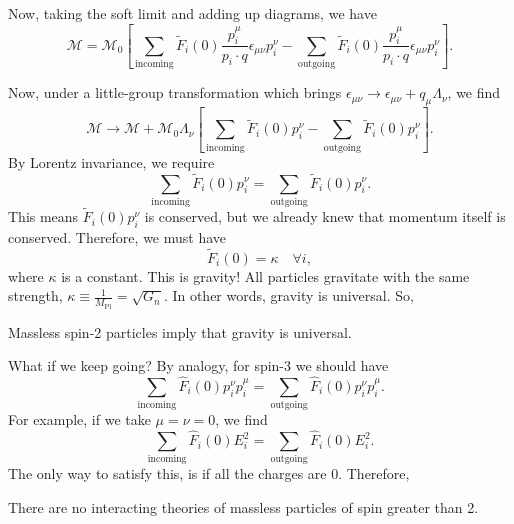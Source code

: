 \documentclass[11pt]{article}
\theoremstyle{definition}
\begin{document}
Now, taking the soft limit and adding up diagrams, we have
\begin{equation}
    \mathcal{M} = \mathcal{M}_0\left[ \sum_\text{incoming}\tilde{F}_i(0) \frac{p_i^\mu}{p_i\cdot q} \epsilon_{\mu\nu}p_i^\nu -  \sum_\text{outgoing}\tilde{F}_i(0) \frac{p_i^\mu}{p_i\cdot q} \epsilon_{\mu\nu}p_i^\nu \right].
\end{equation}

Now, under a little-group transformation which brings $\epsilon_{\mu\nu} \rightarrow \epsilon_{\mu\nu} + q_\mu \Lambda_\nu$, we find
\begin{equation}
    \mathcal{M} \rightarrow \mathcal{M} + \mathcal{M}_0\Lambda_\nu \left[ \sum_\text{incoming}\tilde{F}_i(0) p_i^\nu -  \sum_\text{outgoing}\tilde{F}_i(0) p_i^\nu \right].
\end{equation}
By Lorentz invariance, we require
\begin{equation}
    \sum_\text{incoming}\tilde{F}_i(0) p_i^\nu = \sum_\text{outgoing}\tilde{F}_i(0) p_i^\nu. 
\end{equation}
This means $\tilde{F}_i(0) p_i^\nu$ is conserved, but we already knew that momentum itself is conserved. Therefore, we must have
\begin{equation}
    \tilde{F}_i(0) = \kappa \quad \forall i,
\end{equation}
where $\kappa$ is a constant. This is gravity! All particles gravitate with the same strength, $\kappa \equiv \frac{1}{M_\text{Pl}} = \sqrt{G_n}$. In other words, gravity is universal. So,
\begin{center}
    \begin{shaded}
        Massless spin-2 particles imply that gravity is universal.
    \end{shaded}
\end{center}
What if we keep going? By analogy, for spin-3 we should have
\begin{equation}
     \sum_\text{incoming}\hat{F}_i(0) p_i^\nu p_i^\mu = \sum_\text{outgoing}\hat{F}_i(0) p_i^\nu p_i^\mu.
\end{equation}
For example, if we take $\mu=\nu=0$, we find
\begin{equation}
    \sum_\text{incoming}\hat{F}_i(0) E_i^2 = \sum_\text{outgoing}\hat{F}_i(0) E_i^2.
\end{equation}
The only way to satisfy this, is if all the charges are 0. Therefore,
\begin{center}
    \begin{shaded}
        There are no interacting theories of massless particles of spin greater than 2.
    \end{shaded}
\end{center}
\end{document}
